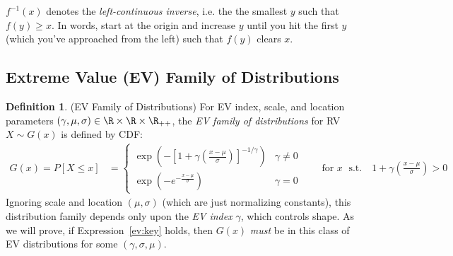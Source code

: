 \documentclass[12pt]{article}
\theoremstyle{plain}
\theoremstyle{definition}
\newtheorem{defn}[thm]{Definition}
\theoremstyle{remark}
\newcommand{\ra}{\rightarrow}
\begin{document}
$f^{-1}(x)$ denotes the \emph{left-continuous inverse}, i.e. the the
smallest $y$ such that $f(y)\geq x$. In words, start at the origin and
increase $y$ until you hit the first $y$ (which you've approached from
the left) such that $f(y)$ clears $x$.


\clearpage
\subsection{Extreme Value (EV) Family of Distributions}


\begin{defn}(EV Family of Distributions)
For EV index, scale, and location parameters
$(\gamma,\mu,\sigma)\in\R\times \R \times \R_{++}$,
the \emph{EV family of distributions} for RV $X\sim G(x)$ is defined by
CDF:
\begin{align*}
  G(x)
  =
  P[X\leq x]
  &=
  \begin{cases}
    \exp\left(
    -\left[1+\gamma \left(\frac{x-\mu}{\sigma}\right)\right]^{-1/\gamma}
    \right)
    & \gamma\neq 0
    \\
    \exp\left(
    -e^{-\frac{x-\mu}{\sigma}}
    \right)
    & \gamma =0
  \end{cases}
  \qquad\text{for $x\;$ s.t.}\quad
  1+\gamma \left(\frac{x-\mu}{\sigma}\right)>0
\end{align*}
Ignoring scale and location $(\mu,\sigma)$ (which are just normalizing
constants), this distribution family depends only upon
the \emph{EV index} $\gamma$, which controls shape.
As we will prove, if Expression~\ref{ev:key} holds, then $G(x)$
\emph{must} be in this class of EV distributions for some
$(\gamma,\sigma,\mu)$.
\end{defn}
\end{document}
